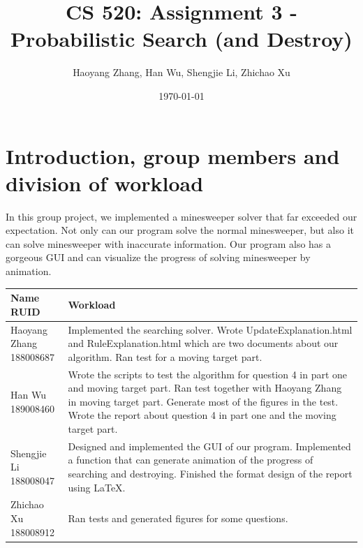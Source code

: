 \documentclass[letter]{article}
\title{CS 520: Assignment 3 - Probabilistic Search (and Destroy)}
\author{Haoyang Zhang, Han Wu, Shengjie Li, Zhichao Xu}
\date{\today}
\begin{document}
\maketitle

\section{Introduction, group members and division of workload}
\label{sec:Introduction}

In this group project, we implemented a minesweeper solver that far exceeded our expectation. Not only can our program solve the normal minesweeper, but also it can solve minesweeper with inaccurate information. Our program also has a gorgeous GUI and can visualize the progress of solving minesweeper by animation. \\
\begin{tabular}{| p{2.5cm} | p{\textwidth -3.5cm} |}
	\hline
	\makecell[c]{Name \\ RUID} & Workload \\
	\hline
	\makecell[c]{Haoyang Zhang \\ 188008687} & {Implemented the searching solver. Wrote UpdateExplanation.html and RuleExplanation.html which are two documents about our algorithm. Ran test for a moving target part.} \\
	\hline
	\makecell[c]{Han Wu \\ 189008460} & {Wrote the scripts to test the algorithm for question 4 in part one and moving target part. Ran test together with Haoyang Zhang in moving target part. Generate most of the figures in the test. Wrote the report about question 4 in part one and the moving target part.} \\
	\hline
	\makecell[c]{Shengjie Li \\ 188008047} & {Designed and implemented the GUI of our program. Implemented a function that can generate animation of the progress of searching and destroying. Finished the format design of the report using \LaTeX. } \\
	\hline
	\makecell[c]{Zhichao Xu \\ 188008912} & {Ran tests and generated figures for some questions.} \\
	\hline
\end{tabular}
\end{document}
